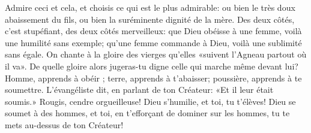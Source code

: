 Admire ceci et cela, et choisis ce qui est le plus admirable:
	ou bien le très doux abaissement du fils, ou bien la suréminente dignité de la mère.
Des deux côtés, c'est stupéfiant, des deux côtés merveilleux:
	que Dieu obéisse à une femme, voilà une humilité sans exemple;	 
	qu'une femme commande à Dieu, voilà une sublimité sans égale.
On chante à la gloire des vierges qu'elles «suivent l'Agneau partout où il va».
De quelle gloire alors jugeras-tu digne celle qui marche même devant lui?
Homme, apprends à obéir ; terre, apprends à t'abaisser;
	poussière, apprends à te soumettre.
L'évangéliste dit, en parlant de ton Créateur: «Et il leur était soumis.»
Rougis, cendre orgueilleuse! Dieu s'humilie, et toi, tu t'élèves!	 
	Dieu se soumet à des hommes, et toi, en t'efforçant de dominer sur les hommes,
	tu te mets au-dessus de ton Créateur!
